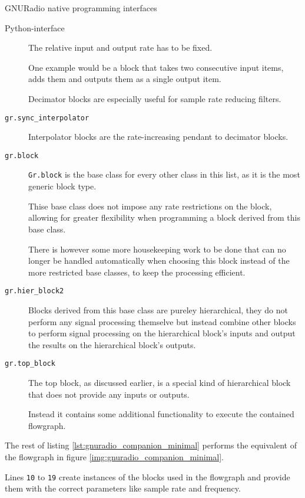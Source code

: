 \begin{subchapter}{GNURadio native programming interfaces}
\begin{subsubchapter}{Python-interface}
\begin{description}
        The relative input and output rate has to be fixed.

        One example would be a block that takes two consecutive input
        items, adds them and outputs them as a single output item.

        Decimator blocks are especially useful for
        sample rate reducing filters.

      \item[\texttt{gr.sync\_interpolator}]
        Interpolator blocks are the rate-increasing pendant
        to decimator blocks.

      \item[\texttt{gr.block}]
        \texttt{Gr.block} is the base class for every other class
        in this list, as it is the most generic block type.

        Thise base class does not impose any rate restrictions
        on the block, allowing for greater flexibility when
        programming a block derived from this base class.

        There is however some more housekeeping work to be
        done that can no longer be handled automatically when
        choosing this block instead of the more restricted base classes,
        to keep the processing efficient.

      \item[\texttt{gr.hier\_block2}]
        Blocks derived from this base class are pureley
        hierarchical, they do not perform any signal processing
        themselve but instead combine other blocks to perform
        signal processing on the hierarchical block's inputs and
        output the results on the hierarchical block's outputs.

      \item[\texttt{gr.top\_block}]
        The top block, as discussed earlier, is a special kind of
        hierarchical block that does not provide any inputs or outputs.

        Instead it contains some additional functionality to execute
        the contained flowgraph.
    \end{description}

    The rest of listing \ref{lst:gnuradio_companion_minimal}
    performs the equivalent of the flowgraph in figure
    \ref{img:gnuradio_companion_minimal}.

    Lines \texttt{10} to \texttt{19} create instances of the
    blocks used in the flowgraph and provide them with the
    correct parameters like sample rate and frequency.


\end{subsubchapter}
\end{subchapter}
